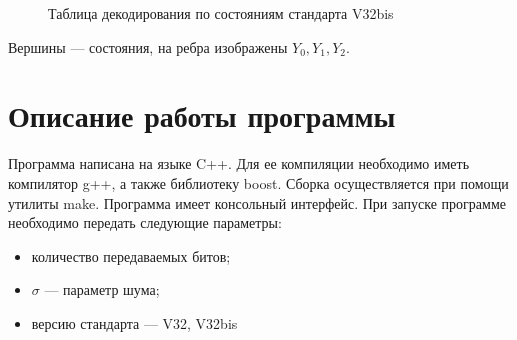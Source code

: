 \documentclass[a4paper,12pt]{article}
\begin{document}
\begin{figure}
	\caption{Таблица декодирования по состояниям стандарта V32bis}
	\label{decodeV32}
\end{figure}

Вершины --- состояния, на ребра изображены $Y_0, Y_1, Y_2$.

\section{Описание работы программы}
Программа написана на языке C++. Для ее компиляции необходимо иметь компилятор g++, а также библиотеку boost. Сборка
осуществляется при помощи утилиты make. Программа имеет консольный интерфейс. При запуске программе необходимо передать 
следующие параметры:
\begin{itemize}
	\item количество передаваемых битов;
	\item $\sigma$ --- параметр шума;
	\item версию стандарта --- V32, V32bis
\end{itemize}
\end{document}
